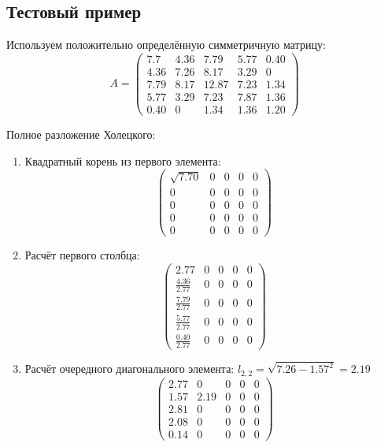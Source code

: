 \clearpage
\subsection{Тестовый пример}
Используем положительно определённую симметричную матрицу:
$$A = \begin{pmatrix}
    7.7  & 4.36 & 7.79  & 5.77 & 0.40 \\
    4.36 & 7.26 & 8.17  & 3.29 & 0    \\
    7.79 & 8.17 & 12.87 & 7.23 & 1.34 \\
    5.77 & 3.29 & 7.23  & 7.87 & 1.36 \\
    0.40 & 0    & 1.34  & 1.36 & 1.20
\end{pmatrix}$$

\begin{multicols}{3}
Полное разложение Холецкого:
\begin{enumerate}
    \item Квадратный корень из первого элемента:
    $$\begin{pmatrix}
        \sqrt{7.70} & 0 & 0 & 0 & 0 \\
        0           & 0 & 0 & 0 & 0 \\
        0           & 0 & 0 & 0 & 0 \\
        0           & 0 & 0 & 0 & 0 \\
        0           & 0 & 0 & 0 & 0
    \end{pmatrix}$$

    \item Расчёт первого столбца:
    $$\begin{pmatrix}
        2.77              & 0 & 0 & 0 & 0 \\
        \frac{4.36}{2.77} & 0 & 0 & 0 & 0 \\
        \frac{7.79}{2.77} & 0 & 0 & 0 & 0 \\
        \frac{5.77}{2.77} & 0 & 0 & 0 & 0 \\
        \frac{0.40}{2.77} & 0 & 0 & 0 & 0
    \end{pmatrix}$$

    \item Расчёт очередного диагонального элемента: $l_{2,2} = \sqrt{7.26 - 1.57^2} = 2.19$
    $$\begin{pmatrix}
        2.77 & 0    & 0 & 0 & 0 \\
        1.57 & 2.19 & 0 & 0 & 0 \\
        2.81 & 0    & 0 & 0 & 0 \\
        2.08 & 0    & 0 & 0 & 0 \\
        0.14 & 0    & 0 & 0 & 0
    \end{pmatrix}$$


\end{enumerate}
\end{multicols}
